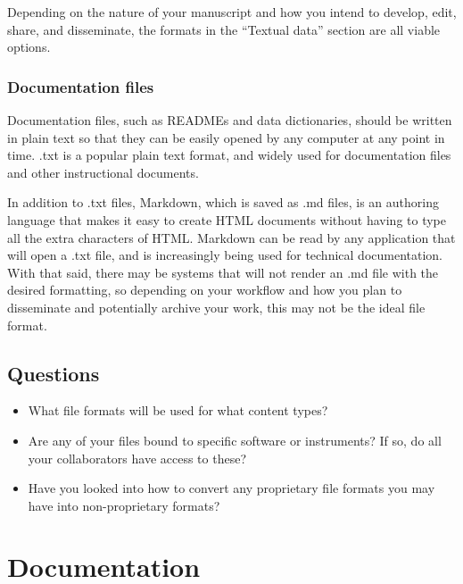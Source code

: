 \documentclass[
]{book}
\providecommand{\tightlist}{%
  \setlength{\itemsep}{0pt}\setlength{\parskip}{0pt}}
\begin{document}
Depending on the nature of your manuscript and how you intend to develop, edit, share, and disseminate, the formats in the ``Textual data'' section are all viable options.

\hypertarget{documentation-files}{%
\subsection*{Documentation files}\label{documentation-files}}

Documentation files, such as READMEs and data dictionaries, should be written in plain text so that they can be easily opened by any computer at any point in time. .txt is a popular plain text format, and widely used for documentation files and other instructional documents.

In addition to .txt files, Markdown, which is saved as .md files, is an authoring language that makes it easy to create HTML documents without having to type all the extra characters of HTML. Markdown can be read by any application that will open a .txt file, and is increasingly being used for technical documentation. With that said, there may be systems that will not render an .md file with the desired formatting, so depending on your workflow and how you plan to disseminate and potentially archive your work, this may not be the ideal file format.

\hypertarget{questions-4}{%
\section*{Questions}\label{questions-4}}

\begin{itemize}
\tightlist
\item
  What file formats will be used for what content types?
\item
  Are any of your files bound to specific software or instruments? If so, do all your collaborators have access to these?
\item
  Have you looked into how to convert any proprietary file formats you may have into non-proprietary formats?
\end{itemize}

\hypertarget{documentation-1}{%
\chapter*{Documentation}\label{documentation-1}}
\end{document}
